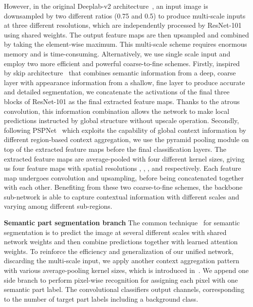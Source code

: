\documentclass[runningheads]{llncs}
\begin{document}
However, in the original Deeplab-v2 architecture~\cite{chen2016deeplab}, an input image is downsampled by two different ratios (0.75 and 0.5) to produce multi-scale inputs at three different resolutions, which are independently processed by ResNet-101 using shared weights. The output feature maps are then upsampled and combined by taking the element-wise maximum. This multi-scale scheme requires enormous memory and is time-consuming. Alternatively, we use single scale input and employ two more efficient and powerful coarse-to-fine schemes. Firstly, inspired by skip architecture~\cite{long2014fully} that combines semantic information from a deep, coarse layer with appearance information from a shallow, fine layer to produce accurate and detailed segmentation, we concatenate the activations of the final three blocks of ResNet-101 as the final extracted feature maps. Thanks to the atrous convolution, this information combination allows the network to make local predictions instructed by global structure without upscale operation. Secondly, following PSPNet~\cite{Zhao_2017_CVPR} which exploits the capability of global context information by different region-based context aggregation, we use the pyramid pooling module on top of the extracted feature maps before the final classification layers. The extracted feature maps are average-pooled with four different kernel sizes, giving us four feature maps with spatial resolutions , , , and  respectively. Each feature map undergoes convolution and upsampling, before being concatenated together with each other. Benefiting from these two coarse-to-fine schemes, the backbone sub-network is able to capture contextual information with different scales and varying among different sub-regions.


\textbf{Semantic part segmentation branch} 
The common technique~\cite{chen2015attention,chen2016deeplab} for semantic segmentation is to predict the image at several different scales with shared network weights and then combine predictions together with learned attention weights. To reinforce the efficiency and generalization of our unified network, discarding the multi-scale input, we apply another context aggregation pattern with various average-pooling kernel sizes, which is introduced in~\cite{Zhao_2017_CVPR}. We append one side branch to perform pixel-wise recognition for assigning each pixel with one semantic part label. The  convolutional classifiers output  channels, corresponding to the number of target part labels including a background class.
\end{document}
